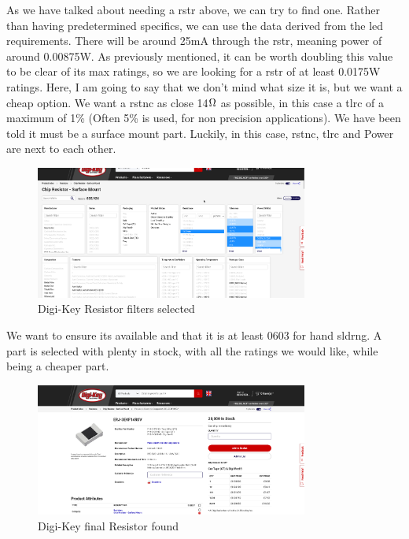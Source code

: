 \documentclass[a4paper,11pt]{report}
\begin{document}
As we have talked about needing a \gls{rstr} above, we can try to find one. Rather than having predetermined specifics, we can use the data derived from the \gls{led} requirements. There will be around 25mA through the \gls{rstr}, meaning power of around 0.00875W. As previously mentioned, it can be worth doubling this value to be clear of its max ratings, so we are looking for a \gls{rstr} of at least 0.0175W ratings. Here, I am going to say that we don't mind what size it is, but we want a cheap option. We want a \gls{rstnc} as close 14$\ohm$ as possible, in this case a \gls{tlrc} of a maximum of 1\% (Often 5\% is used, for non precision applications). We have been told it must be a surface mount part. Luckily, in this case, \gls{rstnc}, \gls{tlrc} and Power are next to each other.

\begin{figure}[H]
\centering
\includegraphics[width=0.8\textwidth]{screenshots/DigiKeyResistor}
\caption{Digi-Key Resistor filters selected}
\end{figure}

We want to ensure its available and that it is at least 0603 for hand \gls{sldrng}. A part is selected with plenty in stock, with all the ratings we would like, while being a cheaper part.

\begin{figure}[H]
\centering
\includegraphics[width=0.8\textwidth]{screenshots/DigiKeyResistorSelected}
\caption{Digi-Key final Resistor found}
\end{figure}
\end{document}
